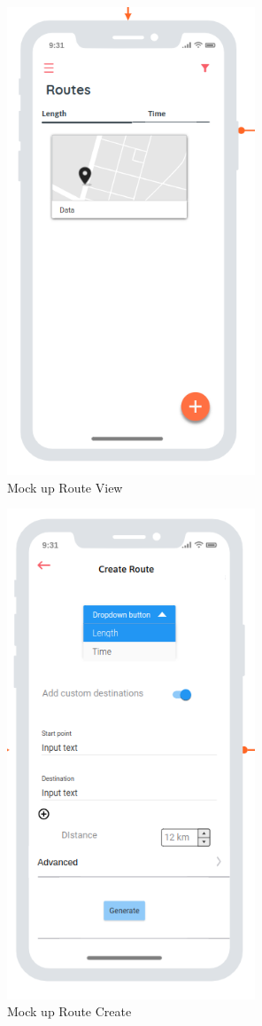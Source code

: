     \begin{figure}[H]
        \includegraphics[width=20em]{./graphics/routeView_Mockup.png}
        \centering
        \caption{Mock up Route View}
        \label{fig:routeViewMockup}
    \end{figure}

    \begin{figure}[H]
        \includegraphics[width=20em]{./graphics/createRoute_Mockup.png}
        \centering
        \caption{Mock up Route Create}
        \label{fig:createRouteMockup}
    \end{figure}

